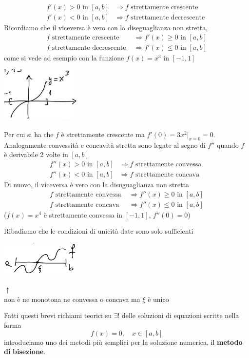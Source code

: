 \documentclass[12pt]{article}
\begin{document}
\[\begin{split}
    f'(x)>0  \text{ in }  [a,b] & \Rightarrow f \text{ strettamente crescente } \\
    f'(x)<0  \text{ in }  [a,b] & \Rightarrow f \text{ strettamente decrescente }
\end{split}\]
Ricordiamo che il viceversa è vero con la diseguaglianza non stretta,
\[\begin{split}
    f \text{ strettamente crescente } & \Rightarrow f'(x)\ge 0 \text{ in } [a,b] \\
    f \text{ strettamente decrescente } & \Rightarrow f'(x)\le 0 \text{ in } [a,b] 
\end{split}\]
come si vede ad esempio con la funzione $f(x)=x^3$ in $[-1,1]$
\begin{center}
    \includegraphics[width=0.3\textwidth]{5.jpg}\par
\end{center}
Per cui si ha che $f$ è strettamente crescente ma $f'(0)=3x^2|_{x=0}=0$.\\
Analogamente convessità e concavità stretta sono legate al segno di $f''$ quando $f$ è derivabile 2 volte in $[a,b]$
\[\begin{split}
    f''(x)>0  \text{ in }  [a,b] & \Rightarrow f \text{ strettamente convessa } \\
    f''(x)<0  \text{ in }  [a,b] & \Rightarrow f \text{ strettamente concava }
\end{split}\]
Di nuovo, il viceversa è vero con la disuguaglianza non stretta
\[\begin{split}
    f \text{ strettamente convessa } & \Rightarrow f''(x)\ge 0 \text{ in } [a,b] \\
    f \text{ strettamente concava } & \Rightarrow f''(x)\le 0 \text{ in } [a,b] 
\end{split}\]
($f(x) = x^4$ è  strettamente convessa in $[-1,1]$, $f''(0) = 0$)

Ribadiamo che le condizioni di unicità date sono solo sufficienti 
\begin{center}
    \includegraphics[width=0.3\textwidth]{pagina8_1.png}\par
$\uparrow$ \\
non è ne monotona ne convessa o concava ma $\xi$ è unico\\
\end{center}
Fatti questi brevi richiami teorici su $\exists!$ delle soluzioni di equazioni scritte nella forma 
\[f(x)=0, \quad x \in [a,b]\]
introduciamo uno dei metodi più semplici per la soluzione numerica, il \textbf{metodo} \textbf{di} \textbf{bisezione}.
\end{document}

